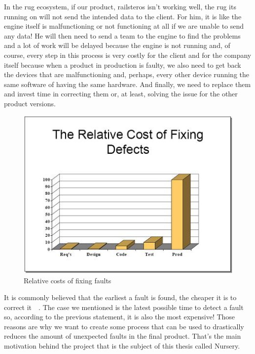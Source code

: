 \documentclass[12pt]{article}
\theoremstyle{definition}
\theoremstyle{definition}
\theoremstyle{remark}
\begin{document}
In the \gls{rug} ecosystem, if our product, \gls{railsteros} isn't working well, the \gls{rug} its running on will not send the intended data to the client. For him, it is like the engine itself is malfunctioning or not functioning at all if we are unable to send any data! He will then need to send a team to the engine to find the problems and a lot of work will be delayed because the engine is not running and, of course, every step in this process is very costly for the client and for the company itself because when a product in production is faulty, we also need to get back the devices that are malfunctioning and, perhaps, every other device running the same software of having the same hardware. And finally, we need to replace them and invest time in correcting them or, at least, solving the issue for the other product versions.\\

\begin{figure}
    \centering
    \includegraphics[scale=0.8]{STBC-costfixs.jpg}
    \caption{Relative costs of fixing faults~\cite{EconomicsSTBC:2017}}
    \label{STBC-costfixs}
\end{figure}

It is commonly believed that the earliest a fault is found, the cheaper it is to correct it~\cite{EconomicsSTBC:2017}~\cite{EconomicsWiki:2017}. The case we mentioned is the latest possible time to detect a fault so, according to the previous statement, it is also the most expensive! Those reasons are why we want to create some process that can be used to drastically reduces the amount of unexpected faults in the final product. That's the main motivation behind the project that is the subject of this thesis called Nursery.\\
\end{document}
